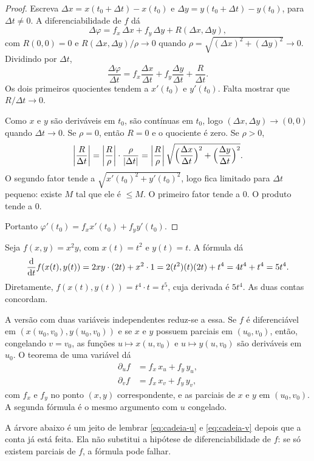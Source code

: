 \documentclass[11pt,a4paper]{article}
\begin{document}
\begin{proof}
Escreva $\Delta x=x(t_0+\Delta t)-x(t_0)$ e $\Delta y=y(t_0+\Delta t)-y(t_0)$, para $\Delta t\neq 0$. A diferenciabilidade de $f$ dá
\[
\Delta\varphi=f_x\,\Delta x+f_y\,\Delta y+R(\Delta x,\Delta y),
\]
com $R(0,0)=0$ e $R(\Delta x,\Delta y)/\rho\to 0$ quando $\rho=\sqrt{(\Delta x)^2+(\Delta y)^2}\to 0$. Dividindo por $\Delta t$,
\[
\frac{\Delta\varphi}{\Delta t}=f_x\frac{\Delta x}{\Delta t}+f_y\frac{\Delta y}{\Delta t}+\frac{R}{\Delta t}.
\]
Os dois primeiros quocientes tendem a $x'(t_0)$ e $y'(t_0)$. Falta mostrar que $R/\Delta t\to 0$.

Como $x$ e $y$ são deriváveis em $t_0$, são contínuas em $t_0$, logo $(\Delta x,\Delta y)\to(0,0)$ quando $\Delta t\to 0$. Se $\rho=0$, então $R=0$ e o quociente é zero. Se $\rho>0$,
\[
\left\lvert \frac{R}{\Delta t} \right\rvert=\left\lvert \frac{R}{\rho} \right\rvert\cdot\frac{\rho}{\left\lvert \Delta t \right\rvert}
=\left\lvert \frac{R}{\rho} \right\rvert\sqrt{\Bigl(\frac{\Delta x}{\Delta t}\Bigr)^2+\Bigl(\frac{\Delta y}{\Delta t}\Bigr)^2}.
\]
O segundo fator tende a $\sqrt{x'(t_0)^2+y'(t_0)^2}$, logo fica limitado para $\Delta t$ pequeno: existe $M$ tal que ele é $\le M$. O primeiro fator tende a $0$. O produto tende a $0$.

Portanto $\varphi'(t_0)=f_x x'(t_0)+f_y y'(t_0)$.
\end{proof}

\begin{exemplo}
Seja $f(x,y)=x^2 y$, com $x(t)=t^2$ e $y(t)=t$. A fórmula dá
\[
\frac{\mathrm{d}}{\mathrm{d} t}f(x(t),y(t))=2xy\cdot(2t)+x^2\cdot 1=2(t^2)(t)(2t)+t^4=4t^4+t^4=5t^4.
\]
Diretamente, $f(x(t),y(t))=t^4\cdot t=t^5$, cuja derivada é $5t^4$. As duas contas concordam.
\end{exemplo}

A versão com duas variáveis independentes reduz-se a essa. Se $f$ é diferenciável em $(x(u_0,v_0),y(u_0,v_0))$ e se $x$ e $y$ possuem parciais em $(u_0,v_0)$, então, congelando $v=v_0$, as funções $u\mapsto x(u,v_0)$ e $u\mapsto y(u,v_0)$ são deriváveis em $u_0$. O teorema de uma variável dá
\begin{align}
\partial_u f &= f_x\, x_u+f_y\, y_u, \label{eq:cadeia-u}\\
\partial_v f &= f_x\, x_v+f_y\, y_v, \label{eq:cadeia-v}
\end{align}
com $f_x$ e $f_y$ no ponto $(x,y)$ correspondente, e as parciais de $x$ e $y$ em $(u_0,v_0)$. A segunda fórmula é o mesmo argumento com $u$ congelado.

A árvore abaixo é um jeito de lembrar \eqref{eq:cadeia-u} e \eqref{eq:cadeia-v} depois que a conta já está feita. Ela não substitui a hipótese de diferenciabilidade de $f$: se só existem parciais de $f$, a fórmula pode falhar.
\end{document}
